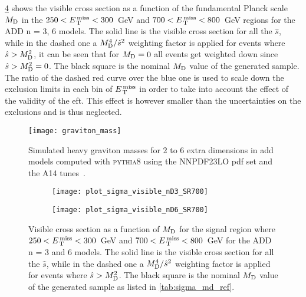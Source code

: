 \cref{fig:vis_sigma_trunc} shows the visible cross section as a function of the
fundamental Planck scale $M_\mathrm{D}$ in the $250 < E_\mathrm{\, T}^\mathrm{\, miss} < 300$~GeV and
$700 < E_\mathrm{\, T}^\mathrm{\, miss} < 800$~GeV regions for the ADD n = 3, 6 models. The solid line is
the visible cross section for all the $\hat{s}$, while in the dashed one a
$M_\mathrm{D}^4/\hat{s}^2$ weighting factor is applied for events where
$\hat{s} > M_\mathrm{D}^2$, it can be seen that for $M_\mathrm{D} = 0$ all events get weighted
down since $\hat{s} > M_\mathrm{D}^2 = 0$. The black square is the nominal $M_\mathrm{D}$ value of
the generated sample. The ratio of the dashed red curve over the blue one is
used to scale down the exclusion limits in each bin of $E_\mathrm{\, T}^\mathrm{\, miss}$ in order to take
into account the effect of the validity of the \gls{eft}. This effect is however
smaller than the uncertainties on the exclusions and is thus neglected.
\begin{figure}[!h]
  \centering
  \texttt{[image: graviton\_mass]}
  \caption{Simulated heavy graviton masses for 2 to 6 extra dimensions in
    \gls{add} models computed with \textsc{pythia8} using the NNPDF23LO
    \gls{pdf} set and the A14 tunes~\cite{OllePhDThesis}.}
  \label{fig:graviton_mass}
\end{figure}
\begin{figure}[!h]
  \centering
  \begin{subfigure}{.48\linewidth}
    \texttt{[image: plot\_sigma\_visible\_nD3\_SR700]}
    \caption{}
    \label{fig:sigma_vis_n3}
  \end{subfigure}
  \begin{subfigure}{.48\linewidth}
    \texttt{[image: plot\_sigma\_visible\_nD6\_SR700]}
    \caption{}
    \label{fig:sigma_vis_n6}
  \end{subfigure}
  \caption{Visible cross section as a function of $M_\mathrm{D}$ for the signal region
    where $250 < E_\mathrm{\, T}^\mathrm{\, miss} < 300$~GeV and $700 < E_\mathrm{\, T}^\mathrm{\, miss} < 800$~GeV for the ADD n = 3
    and 6 models. The solid line is the visible cross section for all the
    $\hat{s}$, while in the dashed one a $M_\mathrm{D}^4/\hat{s}^2$ weighting factor is
    applied for events where $\hat{s} > M_\mathrm{D}^2$. The black square is the nominal
    $M_\mathrm{D}$ value of the generated sample as listed in \cref{tab:sigma_md_ref}.}
  \label{fig:vis_sigma_trunc}
\end{figure}
